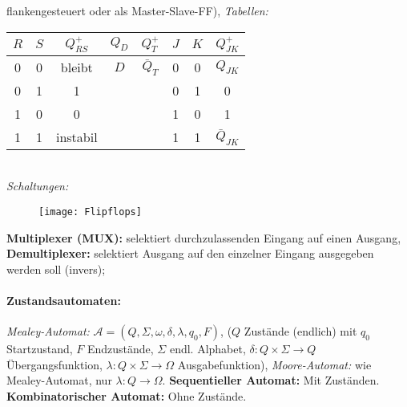 \documentclass[8pt,a4paper]{article}
\begin{document}
\begin{multicols}{2}
flankengesteuert oder als Master-Slave-FF),
\emph{Tabellen:}                                                                                             \\
\begin{tabular}{cc|c||c||c||cc|c}
$R$         & $S$      & $Q^+_{RS}$     & $Q_{D}$               & $Q^+_T$       & $J$ & $K$ & $Q^+_{JK}$     \\\hline
0           & 0        & bleibt         & $D$                   & $\bar{Q}_{T}$ & 0   & 0   & $Q_{JK}$       \\ 
0           & 1        & 1              &                       &               & 0   & 1   & 0              \\
1           & 0        & 0              &                       &               & 1   & 0   & 1              \\
1           & 1        & instabil       &                       &               & 1   & 1   & $\bar{Q}_{JK}$ \\
\end{tabular}                                                                                                \\
\emph{Schaltungen:}
\begin{figure}[H]
  \centering
\texttt{[image: Flipflops]}
\end{figure}
\textbf{Multiplexer (MUX):} selektiert durchzulassenden Eingang auf
einen Ausgang, \textbf{Demultiplexer:} selektiert Ausgang auf den
einzelner Eingang ausgegeben werden soll (invers);

\paragraph{Zustandsautomaten:} \emph{Mealey-Automat:}
$\mathcal{A}=(Q,\Sigma,\omega,\delta,\lambda,q_0,F)$, ($Q$ Zustände (endlich)
mit $q_0$ Startzustand, $F$ Endzustände, $\Sigma$ endl. Alphabet,
$\delta:Q\times \Sigma\to Q$ Übergangsfunktion, $\lambda:Q\times
\Sigma \to \Omega$ Ausgabefunktion), \emph{Moore-Automat:} wie
Mealey-Automat, nur $\lambda:Q\to\Omega$.
\textbf{Sequentieller Automat:} Mit
Zuständen. \textbf{Kombinatorischer Automat:} Ohne Zustände.   


\end{multicols}
\end{document}
